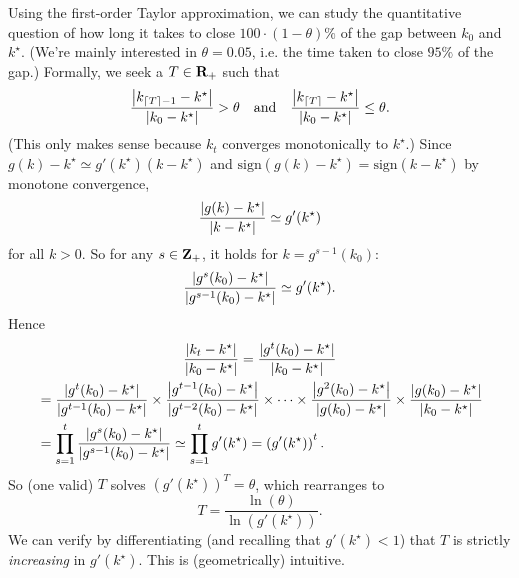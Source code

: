 \documentclass[11pt,letterpaper,reqno,oneside]{article}
\begin{document}
Using the first-order Taylor approximation, we can study the quantitative question of how long it takes to close $100 \cdot (1-\theta) \%$ of the gap between $k_0$ and $k^\star$. (We're mainly interested in $\theta=0.05$, i.e. the time taken to close $95\%$ of the gap.) Formally, we seek a $T \in \R_+$ such that
%
\begin{equation*}
	\frac{\abs*{k_{\ceil{T}-1}-k^\star}}{\abs*{k_0-k^\star}} > \theta 
	\quad\text{and}\quad
	\frac{\abs*{k_{\ceil{T}}-k^\star}}{\abs*{k_0-k^\star}} \leq \theta .
\end{equation*}
%
(This only makes sense because $k_t$ converges monotonically to $k^\star$.) Since $g(k) - k^\star \simeq g'(k^\star) (k-k^\star)$ and $\text{sign}(g(k)-k^\star) = \text{sign}(k-k^\star)$ by monotone convergence,
%
\begin{equation*}
	\frac{\abs*{g(k)-k^\star}}{\abs{k-k^\star}} \simeq g'(k^\star)
\end{equation*}
%
for all $k > 0$. So for any $s \in \Z_+$, it holds for $k = g^{s-1}(k_0)$:
%
\begin{equation*}
	\frac{\abs*{g^s(k_0)-k^\star}}{\abs{g^{s-1}(k_0)-k^\star}} \simeq g'(k^\star) .
\end{equation*}
%
Hence
%
\begin{multline*}
	\frac{\abs*{k_t-k^\star}}{\abs{k_0-k^\star}}
	= \frac{\abs*{g^t(k_0)-k^\star}}{\abs{k_0-k^\star}}
	\\ 
	\begin{aligned}
		&= \frac{\abs*{g^t(k_0)-k^\star}}{\abs{g^{t-1}(k_0)-k^\star}}
		\times \frac{\abs*{g^{t-1}(k_0)-k^\star}}{\abs{g^{t-2}(k_0)-k^\star}}
		\times \cdots 
		\times \frac{\abs*{g^2(k_0)-k^\star}}{\abs{g(k_0)-k^\star}}
		\times \frac{\abs*{g(k_0)-k^\star}}{\abs{k_0-k^\star}}
		\\
		&= \prod_{s=1}^t \frac{\abs*{g^s(k_0)-k^\star}}{\abs{g^{s-1}(k_0)-k^\star}}
		\simeq \prod_{s=1}^t g'(k^\star)
		= \left(g'(k^\star)\right)^t .
	\end{aligned}
\end{multline*}
%
So (one valid) $T$ solves $\left(g'(k^\star)\right)^T = \theta$, which rearranges to
%
\begin{equation*}
	T = \frac{ \ln(\theta) }{ \ln\left(g'(k^\star)\right) } .
\end{equation*}
%
We can verify by differentiating (and recalling that $g'(k^\star)<1$) that $T$ is strictly \emph{increasing} in $g'(k^\star)$. This is (geometrically) intuitive.
\end{document}
